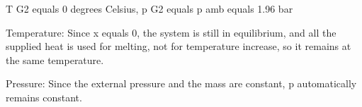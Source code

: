 T G2 equals 0 degrees Celsius, p G2 equals p amb equals 1.96 bar

Temperature: Since x equals 0, the system is still in equilibrium, and all the supplied heat is used for melting, not for temperature increase, so it remains at the same temperature.

Pressure: Since the external pressure and the mass are constant, p automatically remains constant.